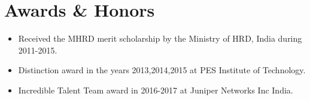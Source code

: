\documentclass[letterpaper,11pt]{article}
\newcommand{\resumeSubHeadingListStart}{\begin{itemize}[leftmargin=*]}
\newcommand{\resumeSubHeadingListEnd}{\end{itemize}}
\begin{document}
\section{Awards \& Honors}
  \resumeSubHeadingListStart
    \item {Received the MHRD merit scholarship by the Ministry of HRD, India during 2011-2015.}
\item {Distinction award in the years 2013,2014,2015 at PES Institute of Technology.} 
\item {Incredible Talent Team award in 2016-2017 at Juniper Networks Inc India.}
  \resumeSubHeadingListEnd

\end{document}
